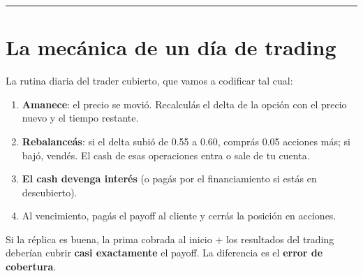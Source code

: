 \documentclass[
  spanish,
  letterpaper,
  DIV=11,
  numbers=noendperiod]{scrreprt}
\providecommand{\tightlist}{%
  \setlength{\itemsep}{0pt}\setlength{\parskip}{0pt}}
\begin{document}
\begin{center}\rule{0.5\linewidth}{0.5pt}\end{center}

\chapter{La mecánica de un día de
trading}\label{la-mecuxe1nica-de-un-duxeda-de-trading}

La rutina diaria del trader cubierto, que vamos a codificar tal cual:

\begin{enumerate}
\def\labelenumi{\arabic{enumi}.}
\tightlist
\item
  \textbf{Amanece}: el precio se movió. Recalculás el delta de la opción
  con el precio nuevo y el tiempo restante.
\item
  \textbf{Rebalanceás}: si el delta subió de 0.55 a 0.60, comprás 0.05
  acciones más; si bajó, vendés. El cash de esas operaciones entra o
  sale de tu cuenta.
\item
  \textbf{El cash devenga interés} (o pagás por el financiamiento si
  estás en descubierto).
\item
  Al vencimiento, pagás el payoff al cliente y cerrás la posición en
  acciones.
\end{enumerate}

Si la réplica es buena, la prima cobrada al inicio + los resultados del
trading deberían cubrir \textbf{casi exactamente} el payoff. La
diferencia es el \textbf{error de cobertura}.
\end{document}
